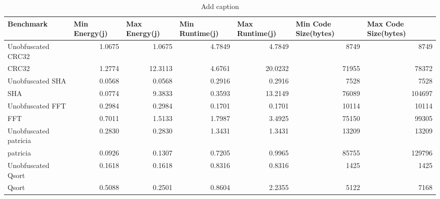 

\begin{table}[htbp]
  \centering
  \caption{Add caption}
    \begin{tabular}{|l|r|r|r|r|r|r|}
    \toprule
    Benchmark & \multicolumn{1}{l|}{Min Energy(j)} & \multicolumn{1}{l|}{Max Energy(j)} & \multicolumn{1}{l|}{Min Runtime(j)} & \multicolumn{1}{l|}{Max Runtime(j)} & \multicolumn{1}{l|}{Min Code Size(bytes)} & \multicolumn{1}{l|}{Max Code Size(bytes)} \\
    \midrule
    Unobfuscated CRC32 & 1.0675 & 1.0675 & 4.7849 & 4.7849 & 8749  & 8749 \\
    \midrule
    CRC32 & 1.2774 & 12.3113 & 4.6761 & 20.0232 & 71955 & 78372 \\
    \midrule
    Unobfuscated SHA & 0.0568 & 0.0568 & 0.2916 & 0.2916 & 7528  & 7528 \\
    \midrule
    SHA   & 0.0774 & 9.3833 & 0.3593 & 13.2149 & 76089 & 104697 \\
    \midrule
    Unobfuscated FFT & 0.2984 & 0.2984 & 0.1701 & 0.1701 & 10114 & 10114 \\
    \midrule
    FFT   & 0.7011 & 1.5133 & 1.7987 & 3.4925 & 75150 & 99305 \\
    \midrule
    Unobfuscated patricia & 0.2830 & 0.2830 & 1.3431 & 1.3431 & 13209 & 13209 \\
    \midrule
    patricia & 0.0926 & 0.1307 & 0.7205 & 0.9965 & 85755 & 129796 \\
    \midrule
    Unobfuscated Qsort & 0.1618 & 0.1618 & 0.8316 & 0.8316 & 1425  & 1425 \\
    \midrule
    Qsort & 0.5088 & 0.2501 & 0.8604 & 2.2355 & 5122  & 7168 \\
    \bottomrule
    \end{tabular}%
  \label{tab:flatten}%
\end{table}%
